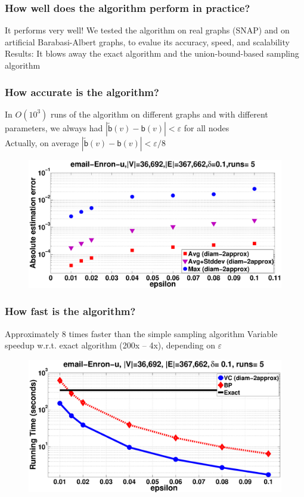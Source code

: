 \documentclass[aspectratio=169]{beamer}
\newcommand*{\betw}{\ensuremath{\mathsf{b}}\xspace}
\begin{document}
\begin{frame}
  \frametitle{How well does the algorithm perform in practice?}
  It performs very well!
  \vfill
  We tested the algorithm on real graphs (SNAP) and on artificial
  Barabasi-Albert graphs, to evalue its accuracy, speed, and scalability
  \vfill
  Results: It blows away the exact algorithm and the union-bound-based
  sampling algorithm
\end{frame}

\begin{frame}
  \frametitle{How accurate is the algorithm?}
  In $O(10^3)$ runs of the algorithm on different graphs and with different
  parameters, we always had $|\tilde{\betw}(v)-\betw(v)|<\varepsilon$ for all
  nodes\\
  \quad Actually, on average $|\tilde{\betw}(v)-\betw(v)|<\varepsilon/8$
  \vfill
  \begin{figure}[H]
    \centering
    \includegraphics[scale=0.22]{figs/email-Enron-error}
  \end{figure}
\end{frame}

\begin{frame}
  \frametitle{How fast is the algorithm?}
  Approximately 8 times faster than the simple sampling algorithm
  \vfill
  Variable speedup w.r.t. exact algorithm (200x -- 4x), depending on
  $\varepsilon$
  \vfill
  \begin{figure}[H]
    \centering
    \includegraphics[scale=0.22]{figs/email-Enron-time}
  \end{figure}
\end{frame}
\end{document}
